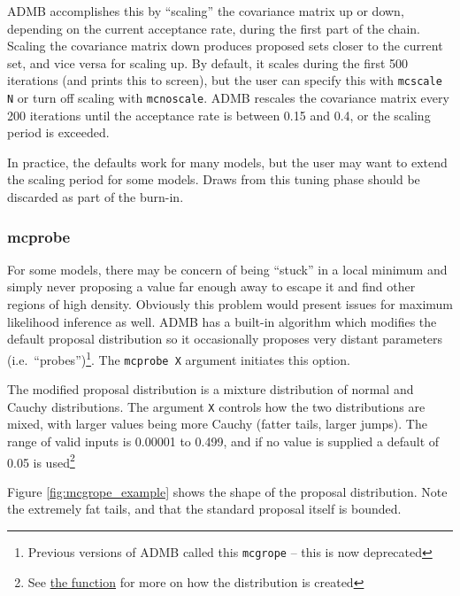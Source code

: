 \documentclass{article}\usepackage[]{graphicx}\usepackage[]{color}
\begin{document}
ADMB accomplishes this by ``scaling'' the covariance matrix
up or down, depending on the current acceptance rate, during
the first part of the chain. Scaling the covariance matrix
down produces proposed sets closer to the current set, and
vice versa for scaling up. By default, it scales during the
first 500 iterations (and prints this to screen), but the
user can specify this with \texttt{mcscale N} or turn off
scaling with \texttt{mcnoscale}. ADMB rescales the
covariance matrix every 200 iterations until the acceptance
rate is between 0.15 and 0.4, or the scaling period is
exceeded.

In practice, the defaults work for many models, but the user
may want to extend the scaling period for some models. Draws
from this tuning phase should be discarded as part of the
burn-in.
\subsubsection{mcprobe}\label{sec:mcprobe}
For some models, there may be concern of being ``stuck'' in
a local minimum and simply never proposing a value far
enough away to escape it and find other regions of high
density. Obviously this problem would present issues for
maximum likelihood inference as well. ADMB has a built-in
algorithm which modifies the default proposal distribution
so it occasionally proposes very distant parameters
(i.e.\ ``probes'')\footnote{Previous versions of ADMB called
  this \texttt{mcgrope} -- this is now deprecated}. The
\texttt{mcprobe X} argument initiates this option.

The modified proposal distribution is a mixture distribution
of normal and Cauchy distributions. The argument \texttt{X}
controls how the two distributions are mixed, with larger
values being more Cauchy (fatter tails, larger jumps). The
range of valid inputs is 0.00001 to 0.499, and if no value
is supplied a default of 0.05 is used\footnote{See
  \href{http://admb-project.org/documentation/api/prmonte\_8cpp\_source.html\#l00014}{the
    function} for more on how the distribution is created}



Figure \ref{fig:mcgrope_example} shows the shape of the
proposal distribution. Note the extremely fat tails, and
that the standard proposal itself is bounded.
\end{document}
